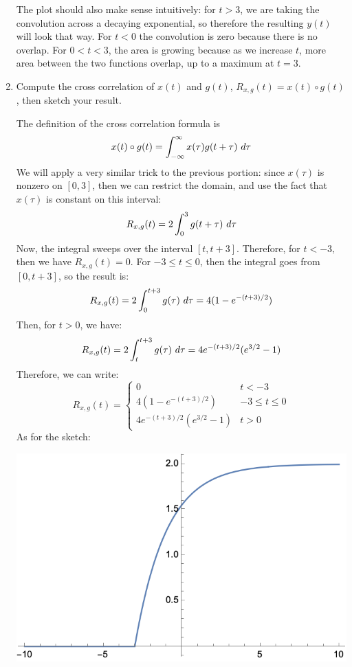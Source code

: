 \documentclass[10pt]{article}
\begin{document}
\begin{enumerate}[label=\alph*)]
\begin{solution}
\begin{center}
				\end{center}
				The plot should also make sense intuitively: for \( t > 3 \), we are taking the convolution across 
				a decaying exponential, so therefore the resulting \( y(t) \) will look that way. For 
				\( t < 0 \) the convolution is zero because there is no overlap. For \( 0 < t < 3 \), the 
				area is growing because as we increase \( t \), more area between the two functions overlap, up to a
				maximum at \( t = 3 \). 
			\end{solution}
		\item Compute the cross correlation of \( x(t)  \) and \( g(t) \), \( R_{x, g}(t) = 
			x(t) \circ g(t)\), then sketch your result.

			\begin{solution}
				The definition of the cross correlation formula is 
				\[
				x(t) \circ g(t) = \int_{-\infty}^{\infty} x(\tau) g( t + \tau) \ d \tau  
				\] 
				We will apply a very similar trick to the previous portion: since \( x(\tau) \) is nonzero 
				on \( [0, 3] \), then we can restrict the domain, and use the fact that \( x(\tau) \) is 
				constant on this interval: 
				\[
				R_{x, g}(t) = 2\int_{0}^{3} g(t + \tau) \ d \tau 
				\] 
				Now, the integral sweeps over the interval  \( [t, t + 3] \). Therefore, for \( t < -3, \) then we 
				have \( R_{x, g}(t) = 0 \). For \( -3 \le  t \le  0 \), then the integral goes from 
				\( [0, t + 3] \), so the result is: 
				\[
				R_{x, g}(t) = 2 \int_{0}^{t + 3} g(\tau) \ d \tau  = 4(1 - e^{-(t + 3) /2})
				\] 
				Then, for \( t > 0 \), we have: 
				\[
				R_{x, g}(t) = 2 \int_{t}^{t + 3} g(\tau) \ d  \tau = 4e^{-(t + 3) /2}(e^{3 /2} - 1)
				\] 
				Therefore, we can write:
				\[
				R_{x, g}(t) = \begin{cases}
					0 & t < -3\\
					4(1 - e^{-(t + 3) /2}) & -3 \le t\le 0\\
					4e^{-(t + 3) /2}(e^{3 /2} - 1) & t>0
				\end{cases}
				\] 
				As for the sketch: 
				\begin{center}
					\includegraphics{q7b.png}

\end{center}
\end{solution}
\end{enumerate}
\end{document}
